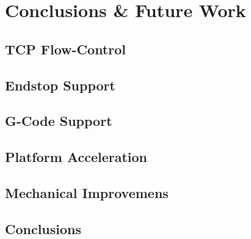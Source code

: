 \chapter{Conclusions \& Future Work}
	
	\label{sec:conclusions}
	
	\section{TCP Flow-Control}
	
	\section{Endstop Support}
	
	\section{G-Code Support}
	
	\section{Platform Acceleration}
	
	\section{Mechanical Improvemens}
	
	\section{Conclusions}
